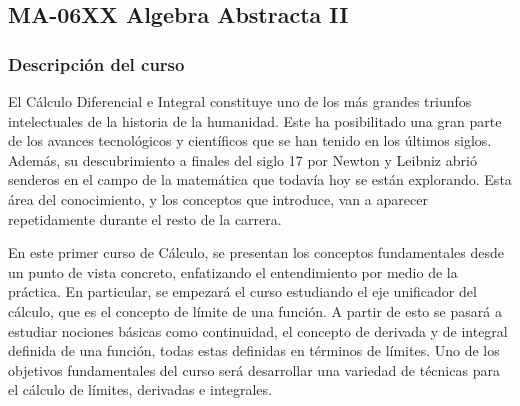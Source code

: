 \newpage
\subsection*{MA-06XX Algebra Abstracta II}

\begin{refsection}
\begin{table}[H]
\end{table}



\subsubsection*{Descripción del curso}

El Cálculo Diferencial e Integral constituye uno de los más grandes triunfos intelectuales de la historia de la humanidad. Este ha posibilitado una gran parte de los avances tecnológicos y científicos que se han tenido en los últimos siglos. Además, su descubrimiento a finales del siglo 17 por Newton y Leibniz  abrió senderos en el campo de la matemática que todavía hoy se están explorando.
Esta área del conocimiento, y los conceptos que introduce, van a aparecer repetidamente durante el resto de la carrera.

En este primer curso de Cálculo, se presentan los conceptos fundamentales desde un punto de vista concreto, enfatizando el entendimiento por medio de la práctica. En particular, se empezará el curso estudiando el eje unificador del cálculo, que es el concepto de límite de una función. A partir de esto se pasará a estudiar nociones básicas como continuidad, el concepto de derivada y de integral definida de una función, todas estas definidas en términos de límites. Uno de los objetivos fundamentales del curso será desarrollar una variedad de técnicas para el cálculo de límites, derivadas e integrales.


\end{refsection}
